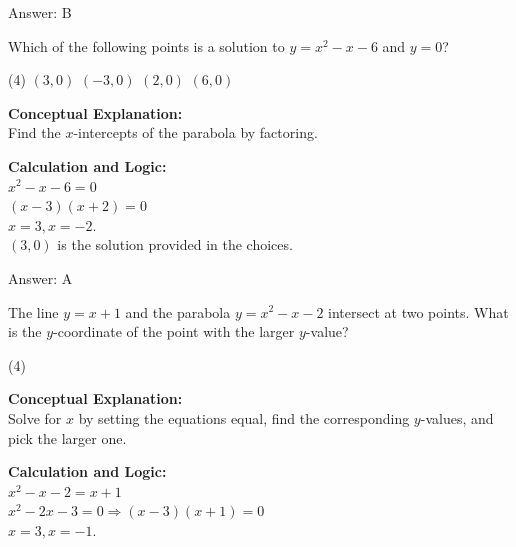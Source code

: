\documentclass[11pt,paper=a4,answers]{exam}
\begin{document}
\begin{questions}
\begin{solution}
Answer: \colorbox{yellow!100}{B}
\end{solution}

\vspace{40pt}

\question
Which of the following points is a solution to $y = x^2 - x - 6$ and $y = 0$?
\begin{tasks}(4)
    \task $(3, 0)$
    \task $(-3, 0)$
    \task $(2, 0)$
    \task $(6, 0)$
\end{tasks}

\begin{solution}
\textbf{Conceptual Explanation:} \\
Find the $x$-intercepts of the parabola by factoring.

\vspace{20pt}

\textbf{Calculation and Logic:} \\
$x^2 - x - 6 = 0$ \\
$(x - 3)(x + 2) = 0$ \\
$x = 3, x = -2$. \\
$(3, 0)$ is the solution provided in the choices.

\vspace{25pt}

Answer: \colorbox{yellow!100}{A}
\end{solution}

\vspace{40pt}

\question
The line $y = x + 1$ and the parabola $y = x^2 - x - 2$ intersect at two points. What is the $y$-coordinate of the point with the larger $y$-value?
\begin{tasks}(4)
\end{tasks}

\begin{solution}
\textbf{Conceptual Explanation:} \\
Solve for $x$ by setting the equations equal, find the corresponding $y$-values, and pick the larger one.

\vspace{20pt}

\textbf{Calculation and Logic:} \\
$x^2 - x - 2 = x + 1$ \\
$x^2 - 2x - 3 = 0 \Rightarrow (x - 3)(x + 1) = 0$ \\
$x = 3, x = -1$.


\end{solution}
\end{questions}
\end{document}

